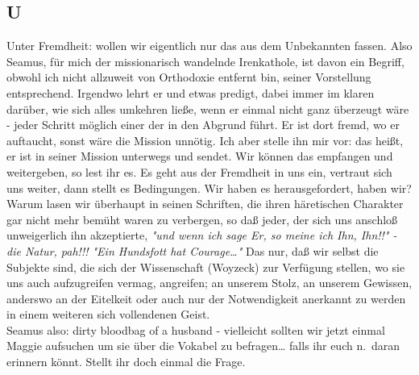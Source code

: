 \documentclass[
]{article}
\author{}
\date{\vspace{-2.5em}}
\begin{document}
\subsection{U}\label{u}

Unter Fremdheit: wollen wir eigentlich nur das aus dem Unbekannten
fassen. Also Seamus, für mich der missionarisch wandelnde Irenkathole,
ist davon ein Begriff, obwohl ich nicht allzuweit von Orthodoxie
entfernt bin, seiner Vorstellung entsprechend. Irgendwo lehrt er und
etwas predigt, dabei immer im klaren darüber, wie sich alles umkehren
ließe, wenn er einmal nicht ganz überzeugt wäre - jeder Schritt möglich
einer der in den Abgrund führt. Er ist dort fremd, wo er auftaucht,
sonst wäre die Mission unnötig. Ich aber stelle ihn mir vor: das heißt,
er ist in seiner Mission unterwegs und sendet. Wir können das empfangen
und weitergeben, so lest ihr es. Es geht aus der Fremdheit in uns ein,
vertraut sich uns weiter, dann stellt es Bedingungen. Wir haben es
herausgefordert, haben wir? Warum lasen wir überhaupt in seinen
Schriften, die ihren häretischen Charakter gar nicht mehr bemüht waren
zu verbergen, so daß jeder, der sich uns anschloß unweigerlich ihn
akzeptierte, \emph{"und wenn ich sage Er, so meine ich Ihn, Ihn!!" - die
Natur, pah!!! "Ein Hundsfott hat Courage\ldots"} Das nur, daß wir selbst
die Subjekte sind, die sich der Wissenschaft (Woyzeck) zur Verfügung
stellen, wo sie uns auch aufzugreifen vermag, angreifen; an unserem
Stolz, an unserem Gewissen, anderswo an der Eitelkeit oder auch nur der
Notwendigkeit anerkannt zu werden in einem weiteren sich vollendenen
Geist.\\
Seamus also: dirty bloodbag of a husband - vielleicht sollten wir jetzt
einmal Maggie aufsuchen um sie über die Vokabel zu befragen\ldots{}
falls ihr euch n.~daran erinnern könnt. Stellt ihr doch einmal die
Frage.
\end{document}
